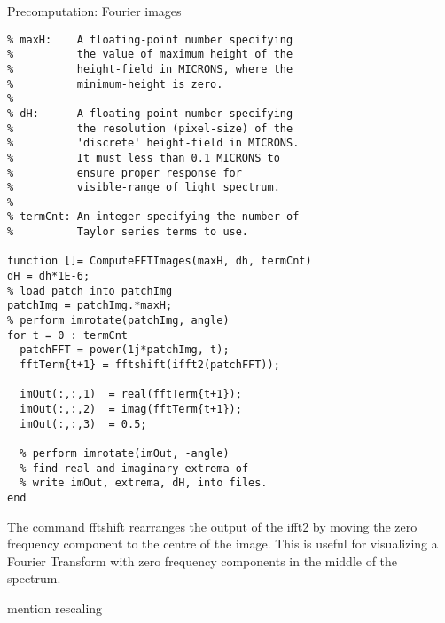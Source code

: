 \begin{algorithm}[H]
\caption{Precomputation: Fourier images}
\begin{lstlisting}
% maxH:    A floating-point number specifying 
%          the value of maximum height of the 
%          height-field in MICRONS, where the 
%          minimum-height is zero. 
%         
% dH:      A floating-point number specifying 
%          the resolution (pixel-size) of the 
%          'discrete' height-field in MICRONS. 
%          It must less than 0.1 MICRONS to 
%          ensure proper response for 
%          visible-range of light spectrum.
%
% termCnt: An integer specifying the number of 
%          Taylor series terms to use.

function []= ComputeFFTImages(maxH, dh, termCnt)
dH = dh*1E-6;
% load patch into patchImg
patchImg = patchImg.*maxH;
% perform imrotate(patchImg, angle)
for t = 0 : termCnt
  patchFFT = power(1j*patchImg, t);
  fftTerm{t+1} = fftshift(ifft2(patchFFT));
  
  imOut(:,:,1)  = real(fftTerm{t+1});
  imOut(:,:,2)  = imag(fftTerm{t+1});
  imOut(:,:,3)  = 0.5;
  
  % perform imrotate(imOut, -angle)
  % find real and imaginary extrema of 
  % write imOut, extrema, dH, into files.
end
\end{lstlisting}
\end{algorithm}

The command fftshift rearranges the output of the ifft2 by moving the zero frequency component to the centre of the image. This is useful for visualizing a Fourier Transform with zero frequency components in the middle of the spectrum.

\label{sec:precompmatlabfft}
mention rescaling

